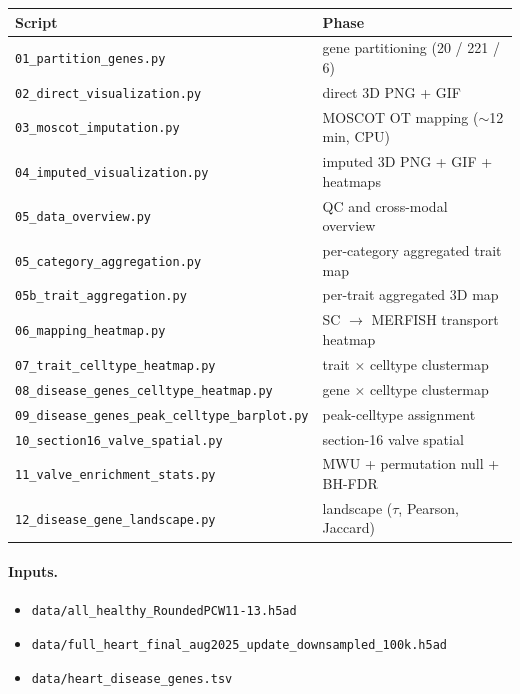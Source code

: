 \documentclass[11pt,a4paper]{article}
\begin{document}
\begin{table}[H]
    \centering\small
    \begin{tabularx}{\linewidth}{@{}l Y@{}}
        \toprule
        \textbf{Script} & \textbf{Phase} \\
        \midrule
        \texttt{01\_partition\_genes.py}                          & gene partitioning (20 / 221 / 6) \\
        \texttt{02\_direct\_visualization.py}                     & direct 3D PNG + GIF \\
        \texttt{03\_moscot\_imputation.py}                        & MOSCOT OT mapping ($\sim$12 min, CPU) \\
        \texttt{04\_imputed\_visualization.py}                    & imputed 3D PNG + GIF + heatmaps \\
        \texttt{05\_data\_overview.py}                            & QC and cross-modal overview \\
        \texttt{05\_category\_aggregation.py}                     & per-category aggregated trait map \\
        \texttt{05b\_trait\_aggregation.py}                       & per-trait aggregated 3D map \\
        \texttt{06\_mapping\_heatmap.py}                          & SC $\to$ MERFISH transport heatmap \\
        \texttt{07\_trait\_celltype\_heatmap.py}                  & trait $\times$ celltype clustermap \\
        \texttt{08\_disease\_genes\_celltype\_heatmap.py}         & gene $\times$ celltype clustermap \\
        \texttt{09\_disease\_genes\_peak\_celltype\_barplot.py}   & peak-celltype assignment \\
        \texttt{10\_section16\_valve\_spatial.py}                 & section-16 valve spatial \\
        \texttt{11\_valve\_enrichment\_stats.py}                  & MWU + permutation null + BH-FDR \\
        \texttt{12\_disease\_gene\_landscape.py}                  & landscape ($\tau$, Pearson, Jaccard) \\
        \bottomrule
    \end{tabularx}
\end{table}

\paragraph{Inputs.}
\begin{itemize}[leftmargin=*,itemsep=1pt]
    \item \texttt{data/all\_healthy\_RoundedPCW11-13.h5ad}
    \item \texttt{data/full\_heart\_final\_aug2025\_update\_downsampled\_100k.h5ad}
    \item \texttt{data/heart\_disease\_genes.tsv}
\end{itemize}
\end{document}
